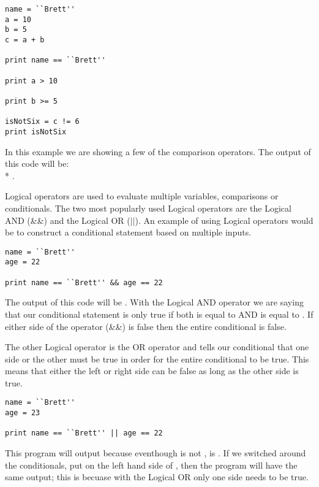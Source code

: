 \begin{lstlisting}[caption={Comparison Operators}]
name = ``Brett''
a = 10
b = 5
c = a + b

print name == ``Brett''

print a > 10

print b >= 5

isNotSix = c != 6
print isNotSix

\end{lstlisting}

In this example we are showing a few of the comparison operators.
The output of this code will be:\\*
.
\par

Logical operators are used to evaluate multiple variables, comparisons or conditionals.
The two most popularly used Logical operators are the Logical AND (\&\&) and the Logical OR ($\vert$$\vert$).
An example of using Logical operators would be to construct a conditional statement based on multiple inputs.

\begin{lstlisting}[caption={Logical AND Example}]
name = ``Brett''
age = 22

print name == ``Brett'' && age == 22
\end{lstlisting}

The output of this code will be .
With the Logical AND operator we are saying that our conditional statement is only true if both  is equal to  AND  is equal to .
If either side of the operator (\&\&) is false then the entire conditional is false.
\par

The other Logical operator is the OR operator and tells our conditional that one side or the other must be true in order for the entire conditional to be true.
This means that either the left or right side can be false as long as the other side is true.

\begin{lstlisting}[caption={Logical OR Example}]
name = ``Brett''
age = 23

print name == ``Brett'' || age == 22
\end{lstlisting}

This program will output  because eventhough  is not ,  is .
If we switched around the conditionals, put  on the left hand side of \pigVar{||}, then the program will have the same output; this is becuase with the Logical OR only one side needs to be true.
\par

